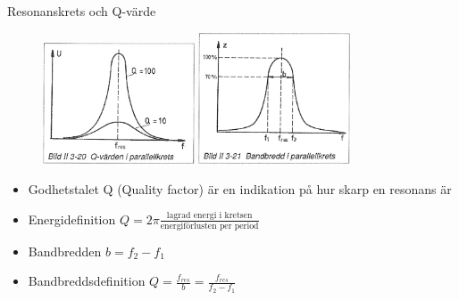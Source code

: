 \documentclass{beamer}
\begin{document}
\begin{frame}{Resonanskrets och Q-värde}

\begin{figure}[h]
\includegraphics[width=0.4\textwidth]{images/bild_2_3-20}
\includegraphics[width=0.4\textwidth]{images/bild_2_3-21}
\end{figure}

\begin{itemize}
  \item Godhetstalet Q (Quality factor) är en indikation på hur skarp en resonans är
  \item Energidefinition $Q = 2π\frac{\text{lagrad energi i kretsen}}{\text{energiförlusten per period}}$
    \item Bandbredden $b = f_2-f_1$
  \item Bandbreddsdefinition $Q = \frac{f_{res}}{b} = \frac{f_{res}}{f_2-f_1}$
  \end{itemize}
\end{frame}
\end{document}

